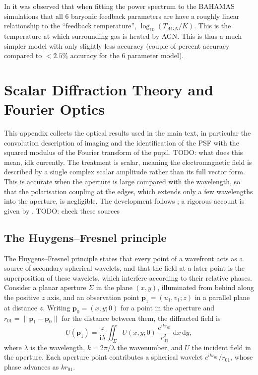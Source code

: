 \documentclass[11pt]{book}
\begin{document}
In \cite{Mead_2021} it was observed that when fitting the power spectrum to the BAHAMAS simulations %
that all 6 baryonic feedback parameters are have a roughly linear relationship to the ``feedback temperature'', $\log_{10}(T_{AGN}/K)$. This is the temperature at which surrounding gas is heated by AGN. This is thus a much simpler model with only slightly less accuracy (couple of percent accuracy compared to $<2.5\%$ accuracy for the 6 parameter model).

\chapter{Scalar Diffraction Theory and Fourier Optics}
\label{app:optics}

This appendix collects the optical results used in the main text, in particular the convolution description of imaging and the identification of the PSF with the squared modulus of the Fourier transform of the pupil. TODO: what does this mean, idk currently. The treatment is scalar, meaning the electromagnetic field is described by a single complex scalar amplitude rather than its full vector form. This is accurate when the aperture is large compared with the wavelength, so that the polarisation coupling at the edges, which extends only a few wavelengths into the aperture, is negligible. The development follows \cite{goodman2005}; a rigorous account is given by \cite{born_wolf1999}. TODO: check these sources 

\section{The Huygens--Fresnel principle}

The Huygens--Fresnel principle states that every point of a wavefront acts as a source of secondary spherical wavelets, and that the field at a later point is the superposition of these wavelets, which interfere according to their relative phases. Consider a planar aperture $\Sigma$ in the plane $(x,y)$, illuminated from behind along the positive $z$ axis, and an observation point $\mathbf{p}_1=(u_1,v_1;z)$ in a parallel plane at distance $z$. Writing $\mathbf{p}_0=(x,y;0)$ for a point in the aperture and $r_{01}=\lVert\mathbf{p}_1-\mathbf{p}_0\rVert$ for the distance between them, the diffracted field is
\begin{equation}
U(\mathbf{p}_1) = \frac{z}{\mathrm{i}\lambda}\iint_\Sigma U(x,y;0)\,\frac{e^{\mathrm{i}kr_{01}}}{r_{01}^2}\,\mathrm{d}x\,\mathrm{d}y,
\label{eq:hf}
\end{equation}
where $\lambda$ is the wavelength, $k=2\pi/\lambda$ the wavenumber, and $U$ the incident field in the aperture. Each aperture point contributes a spherical wavelet $e^{\mathrm{i}kr_{01}}/r_{01}$, whose phase advances as $kr_{01}$.
\end{document}
